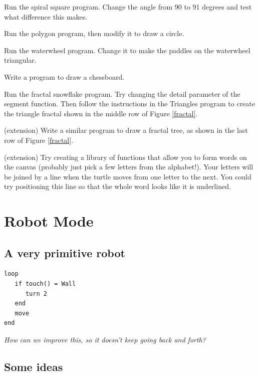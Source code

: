 \documentclass[12pt,a4paper,twoside]{article}
\renewcommand{\_}{\texttt{\symbol{95}}}
\begin{document}
\begin{numericlist}
\item Run the spiral square program.
	Change the angle from 90 to 91 degrees and test what difference
	this makes.
\item Run the polygon program, then modify it to draw a circle.
\item Run the waterwheel program. Change it to make the paddles on the
	waterwheel triangular.
\item Write a program to draw a chessboard.
\item Run the fractal snowflake program. Try changing the detail parameter of the segment function. Then follow the instructions in the Triangles program to create the triangle fractal shown in the middle row of Figure \ref{fractal}. 
\item (extension) Write a similar program to draw a fractal tree, as shown in the last row of Figure \ref{fractal}.
%
      \item (extension) Try creating a library of functions that allow
        you to form words on the canvas (probably just pick a few
        letters from the alphabet!). Your letters will be joined by a
        line when the turtle moves from one letter to the next. You
        could try positioning this line so that the whole word looks
        like it is underlined.
%
\end{numericlist}


\section{Robot Mode}\label{sec:robot-mode}

\subsection{A very primitive robot}

\begin{verbatim}
loop
   if touch() = Wall
      turn 2
   end
   move
end
\end{verbatim}

\textit{How can we improve this, so it doesn't keep going back and forth?}

\subsection{Some ideas}
\end{document}
